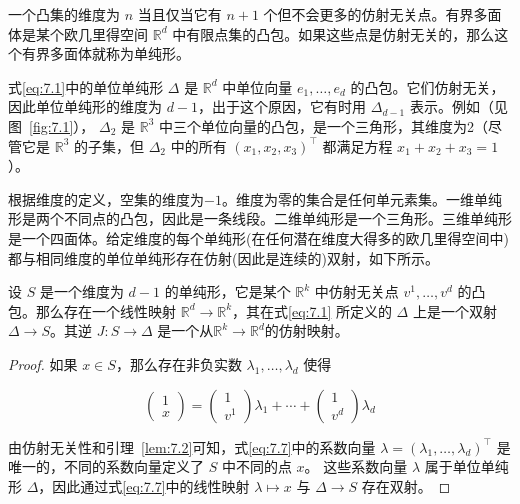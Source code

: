 一个凸集的维度为 \(n\) 当且仅当它有 \(n + 1\) 个但不会更多的仿射无关点。有界多面体是某个欧几里得空间 \({\mathbb{R}}^{d}\) 中有限点集的凸包。如果这些点是仿射无关的，那么这个有界多面体就称为单纯形。

式\eqref{eq:7.1}中的单位单纯形 \(\Delta\) 是 \({\mathbb{R}}^{d}\) 中单位向量 \({e}_{1},\ldots,{e}_{d}\) 的凸包。它们仿射无关，因此单位单纯形的维度为 \(d - 1\)，出于这个原因，它有时用 \({\Delta }_{d - 1}\) 表示。例如（见图~\ref{fig:7.1}）， \({\Delta }_{2}\) 是 \({\mathbb{R}}^{3}\) 中三个单位向量的凸包，是一个三角形，其维度为2（尽管它是 \({\mathbb{R}}^{3}\) 的子集，但 \({\Delta }_{2}\) 中的所有 \({\left( {x}_{1},{x}_{2},{x}_{3}\right) }^{\top }\) 都满足方程 \({{x}_{1} + {x}_{2} + {x}_{3} = 1}\)）。

根据维度的定义，空集的维度为$-1$。维度为零的集合是任何单元素集。一维单纯形是两个不同点的凸包，因此是一条线段。二维单纯形是一个三角形。三维单纯形是一个四面体。给定维度的每个单纯形(在任何潜在维度大得多的欧几里得空间中)都与相同维度的单位单纯形存在仿射(因此是连续的)双射，如下所示。


\begin{lemma}\label{lem:7.3}
设 \(S\) 是一个维度为 \(d - 1\) 的单纯形，它是某个 \({\mathbb{R}}^{k}\) 中仿射无关点 \({v}^{1},\ldots,{v}^{d}\) 的凸包。那么存在一个线性映射 \({\mathbb{R}}^{d} \rightarrow  {\mathbb{R}}^{k}\)，其在式\eqref{eq:7.1} 所定义的 \(\Delta\) 上是一个双射 \(\Delta  \rightarrow  S\)。其逆 \(J : S \rightarrow  \Delta\) 是一个从\({\mathbb{R}}^{k} \rightarrow  {\mathbb{R}}^{d}\)的仿射映射。
\end{lemma}


\begin{proof}
如果 \(x \in  S\)，那么存在非负实数 \({\lambda }_{1},\ldots,{\lambda }_{d}\) 使得

\begin{equation}
\left( \begin{array}{l} 1 \\  x \end{array}\right)  = \left( \begin{matrix} 1 \\  {v}^{1} \end{matrix}\right) {\lambda }_{1} + \cdots  + \left( \begin{matrix} 1 \\  {v}^{d} \end{matrix}\right) {\lambda }_{d}\label{eq:7.7}
\end{equation}

由仿射无关性和引理~\ref{lem:7.2}可知，式\eqref{eq:7.7}中的系数向量 \(\lambda  = {\left( {\lambda }_{1},\ldots,{\lambda }_{d}\right) }^{\top }\) 是唯一的，不同的系数向量定义了 \( S \) 中不同的点 $x$。 这些系数向量 \(\lambda\) 属于单位单纯形 \(\Delta\)，因此通过式\eqref{eq:7.7}中的线性映射 \(\lambda  \mapsto  x\) 与 \(\Delta  \rightarrow  S\) 存在双射。
\end{proof}

